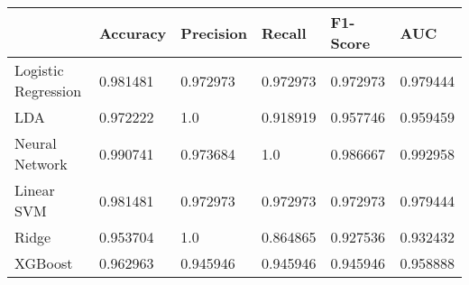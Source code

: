 \begin{tabular}{llllll}
    \toprule
    {}                  & Accuracy & Precision & Recall   & F1-Score & AUC      \\
    \midrule
    Logistic Regression & 0.981481 & 0.972973  & 0.972973 & 0.972973 & 0.979444 \\
    LDA                 & 0.972222 & 1.0       & 0.918919 & 0.957746 & 0.959459 \\
    Neural Network      & 0.990741 & 0.973684  & 1.0      & 0.986667 & 0.992958 \\
    Linear SVM          & 0.981481 & 0.972973  & 0.972973 & 0.972973 & 0.979444 \\
    Ridge               & 0.953704 & 1.0       & 0.864865 & 0.927536 & 0.932432 \\
    XGBoost             & 0.962963 & 0.945946  & 0.945946 & 0.945946 & 0.958888 \\
    \bottomrule
\end{tabular}

